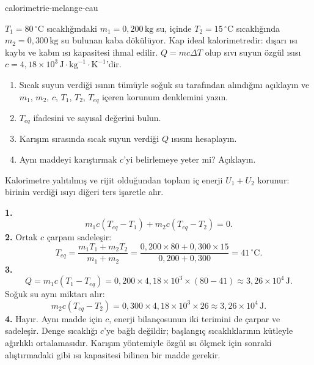 \begin{exo}{calorimetrie-melange-eau}

$T_1=80\,^\circ\text{C}$ sıcaklığındaki $m_1=0{,}200\,\text{kg}$ su, içinde $T_2=15\,^\circ\text{C}$ sıcaklığında $m_2=0{,}300\,\text{kg}$ su bulunan kaba dökülüyor. Kap ideal kalorimetredir: dışarı ısı kaybı ve kabın ısı kapasitesi ihmal edilir. $Q=mc\Delta T$ olup sıvı suyun özgül ısısı $c=4{,}18\times10^3\,\text{J}\!\cdot\!\text{kg}^{-1}\!\cdot\!\text{K}^{-1}$'dir.
\begin{enumerate}
  \item Sıcak suyun verdiği ısının tümüyle soğuk su tarafından alındığını açıklayın ve $m_1$, $m_2$, $c$, $T_1$, $T_2$, $T_{eq}$ içeren korunum denklemini yazın.
  \item $T_{eq}$ ifadesini ve sayısal değerini bulun.
  \item Karışım sırasında sıcak suyun verdiği $Q$ ısısını hesaplayın.
  \item Aynı maddeyi karıştırmak $c$'yi belirlemeye yeter mi? Açıklayın.
\end{enumerate}
\begin{indication}
Kalorimetre yalıtılmış ve rijit olduğundan toplam iç enerji $U_1+U_2$ korunur: birinin verdiği ısıyı diğeri ters işaretle alır.
\end{indication}
\begin{solution}
\textbf{1.}
\[
m_1c(T_{eq}-T_1)+m_2c(T_{eq}-T_2)=0.
\]
\textbf{2.} Ortak $c$ çarpanı sadeleşir:
\[
T_{eq}=\frac{m_1T_1+m_2T_2}{m_1+m_2}
=\frac{0{,}200\times80+0{,}300\times15}{0{,}200+0{,}300}=41\,^\circ\text{C}.
\]
\textbf{3.}
\[
Q=m_1c(T_1-T_{eq})=0{,}200\times4{,}18\times10^3\times(80-41)
\approx3{,}26\times10^4\,\text{J}.
\]
Soğuk su aynı miktarı alır:
\[
m_2c(T_{eq}-T_2)=0{,}300\times4{,}18\times10^3\times26
\approx3{,}26\times10^4\,\text{J}.
\]
\textbf{4.} Hayır. Aynı madde için $c$, enerji bilançosunun iki terimini de çarpar ve sadeleşir. Denge sıcaklığı $c$'ye bağlı değildir; başlangıç sıcaklıklarının kütleyle ağırlıklı ortalamasıdır. Karışım yöntemiyle özgül ısı ölçmek için sonraki alıştırmadaki gibi ısı kapasitesi bilinen bir madde gerekir.
\end{solution}
\end{exo}

